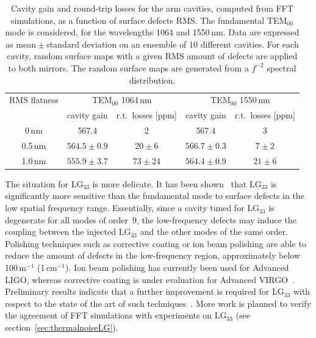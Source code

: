 \begin{table}[h]
\begin{center}
\begin{tabular}{ccccc}
%
\hline
RMS flatness 	& \multicolumn{2}{c}{TEM$_{00}$ 1064\,nm} 	& \multicolumn{2}{c}{TEM$_{00}$ 1550\,nm}\\
				& cavity gain 	& r.t.\ losses [ppm]			& cavity gain 	& r.t.\ losses [ppm]		\\
\hline
0\,nm 			& 567.4			& 2							& 567.4			& 3						\\
0.5\,nm			& $564.5\pm0.9$	& $20\pm6$					& $566.7\pm0.3$	& $7\pm2$				\\
1.0\,nm			& $555.9\pm3.7$	& $73\pm24$					& $564.4\pm0.9$	& $21\pm6$				\\
\hline
%
\end{tabular}
\end{center}
\caption[Round-trip losses as a function of surface defects]{Cavity gain and round-trip losses for the arm cavities, computed from FFT simulations, as a function of surface defects RMS. The fundamental TEM$_{00}$ mode is considered, for the wavelengths 1064 and 1550\,nm. Data are expressed as mean${}\pm{}$standard deviation on an ensemble of 10 different cavities. For each cavity, random surface maps with a given RMS amount of defects are applied to both mirrors. The random surface maps are generated from a $f^{-2}$ spectral distribution.}
\label{tab:msurface}
\end{table}


The situation for LG$_{33}$ is more delicate. It has been shown~\cite{Galimberti2010b} that LG$_{33}$ is significantly more sensitive than the fundamental mode to surface defects in the low spatial frequency range. Essentially, since a cavity tuned for LG$_{33}$ is degenerate for all modes of order~9, the low-frequency defects may induce the coupling between the injected LG$_{33}$ and the other modes of the same order. Polishing techniques such as corrective coating or ion beam polishing are able to reduce the amount of defects in the low-frequency region, approximately below 100\,m$^{-1}$ (1\,cm$^{-1}$). Ion beam polishing has currently been used for Advanced LIGO, whereas corrective coating is under evaluation for Advanced VIRGO~\cite{Billingsley2011, Bonnand2011}. Preliminary results indicate that a further improvement is required for LG$_{33}$ with respect to the state of the art of such techniques~\cite{Galimberti2010b}. More work is planned to verify the agreement of FFT simulations with experiments on LG$_{33}$ (see section~\ref{sec:thermalnoiseLG}).

